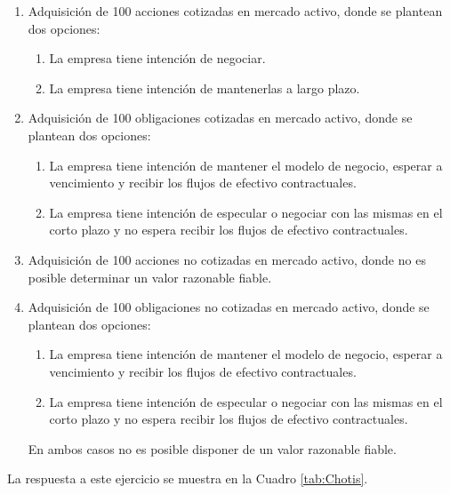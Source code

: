 \begin{enumerate}
    \item Adquisición de 100 acciones cotizadas en mercado activo, donde se plantean dos opciones:
    \begin{enumerate}
        \item La empresa tiene intención de negociar.
        \item La empresa tiene intención de mantenerlas a largo plazo.
    \end{enumerate}
    \item Adquisición de 100 obligaciones cotizadas en mercado activo, donde se plantean dos opciones:
    \begin{enumerate}
        \item La empresa tiene intención de mantener el modelo de negocio, esperar a vencimiento y recibir los flujos de efectivo contractuales.
        \item La empresa tiene intención de especular o negociar con las mismas en el corto plazo y no espera recibir los flujos de efectivo contractuales.
    \end{enumerate}
    \item Adquisición de 100 acciones no cotizadas en mercado activo, donde no es posible determinar un valor razonable fiable.
    \item Adquisición de 100 obligaciones no cotizadas en mercado activo, donde se plantean dos opciones:
    \begin{enumerate}
        \item La empresa tiene intención de mantener el modelo de negocio, esperar a vencimiento y recibir los flujos de efectivo contractuales.
        \item La empresa tiene intención de especular o negociar con las mismas en el corto plazo y no espera recibir los flujos de efectivo contractuales.
    \end{enumerate}
    En ambos casos no es posible disponer de un valor razonable fiable.
\end{enumerate}

La respuesta a este ejercicio se muestra en la Cuadro \ref{tab:Chotis}.


